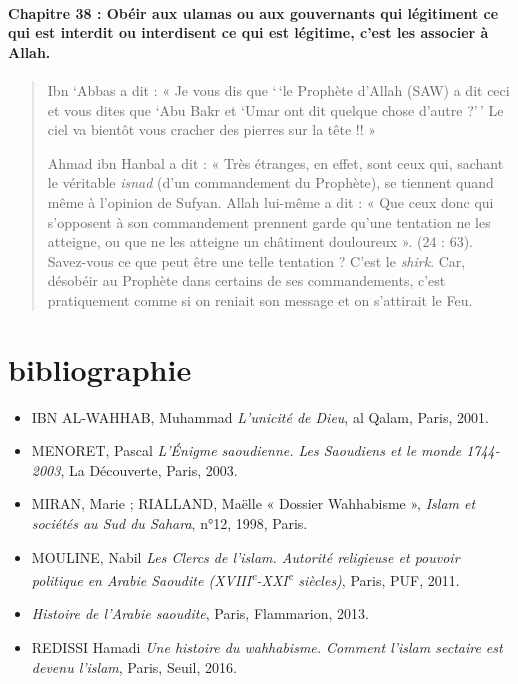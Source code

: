 \paragraph{{Chapitre 38} : Obéir aux ulamas ou aux gouvernants
qui légitiment ce qui est interdit ou interdisent ce qui est légitime,
c'est les associer à Allah.}
\begin{quote}
Ibn `Abbas a dit : « Je vous dis que `\,`le Prophète d'Allah (SAW) a dit
ceci et vous dites que `Abu Bakr et `Umar ont dit quelque chose d'autre
?'\,' Le ciel va bientôt vous cracher des pierres sur la tête !! »

Ahmad ibn Hanbal a dit : « Très étranges, en effet, sont ceux qui,
sachant le véritable \emph{isnad} (d'un commandement du Prophète), se
tiennent quand même à l'opinion de Sufyan. Allah lui-même a dit : « Que
ceux donc qui s'opposent à son commandement prennent garde qu'une
tentation ne les atteigne, ou que ne les atteigne un châtiment
douloureux ». (24 : 63). Savez-vous ce que peut être une telle tentation
? C'est le \emph{shirk}. Car, désobéir au Prophète dans certains de ses
commandements, c'est pratiquement comme si on reniait son message et on
s'attirait le Feu.

\end{quote}


\section{bibliographie}

 

\begin{itemize}
\item
 
  IBN AL-WAHHAB, Muhammad \emph{L'unicité de Dieu}, al Qalam, Paris,
  2001.
 


 \item
MENORET, Pascal \emph{L'Énigme saoudienne. Les Saoudiens et le monde
1744-2003}, La Découverte, Paris, 2003.
\item
MIRAN, Marie ; RIALLAND, Maëlle « Dossier Wahhabisme », \emph{Islam et
sociétés au Sud du Sahara}, n°12, 1998, Paris.
\item
MOULINE, Nabil \emph{Les Clercs de l'islam. Autorité religieuse et
pouvoir politique en Arabie Saoudite
(XVIII\textsuperscript{e}-XXI\textsuperscript{e} siècles)}, Paris, PUF,
2011.
\item
  \emph{Histoire de l'Arabie
saoudite}, Paris, Flammarion, 2013.
\item
REDISSI Hamadi \emph{Une histoire du wahhabisme. Comment l'islam
sectaire est devenu l'islam}, Paris, Seuil, 2016.
 \end{itemize}